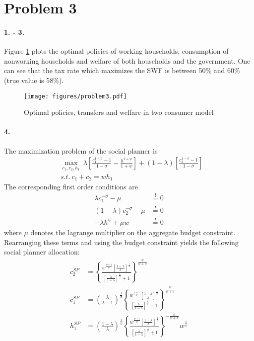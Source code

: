 \section*{Problem 3}

\paragraph{1. - 3.}
Figure \ref{fig:problem3} plots the optimal policies of working households, consumption of nonworking households and welfare of both households and the government. One can see that the tax rate which maximizes the SWF is between 50\% and 60\% (true value is 58\%).
\begin{figure}[h]
\texttt{[image: figures/problem3.pdf]}
\caption{Optimal policies, transfers and welfare in two consumer model}
\label{fig:problem3}
\end{figure}

\paragraph{4.}
The maximization problem of the social planner is
\begin{align*}
&\max_{c_1, c_2, h_1} ~ \lambda \left[\frac{c_1^{1 - \sigma} - 1}{1 - \sigma} - \frac{h^{1 + \psi}}{1 + \psi}\right] + \left(1 - \lambda\right) \left[ \frac{c_2^{1 - \sigma} - 1}{1 - \sigma}\right] \\
&s.t.~c_1 + c_2 = w h_1
\end{align*}
The corresponding first order conditions are
\begin{align*}
\lambda c_1^{- \sigma} - \mu &\overset{!}{=} 0 \\
\left(1 - \lambda \right) c_2^{- \sigma} - \mu &\overset{!}{=} 0 \\
- \lambda h^\psi + \mu w &\overset{!}{=} 0
\end{align*}
where $\mu $ denotes the lagrange multiplier on the aggregate budget constraint.
Rearranging these terms and using the budget constraint yields the following social planner allocation:
\begin{align*}
c_2^{SP} &= \left\{ \frac{ w^{ \frac{\psi + 1}{\psi} } \left[\frac{1 - \lambda}{\lambda}\right]^{ \frac{1}{\psi} } }{ \left[ \frac{\lambda}{1 - \lambda} \right]^{ \frac{1}{\sigma} } + 1 } \right\}^{\frac{\psi}{\psi + \sigma}} \\
c_1^{SP} &= \left(\frac{\lambda}{\lambda - 1}\right)^{ \frac{1}{\sigma} }
\left\{ \frac{ w^{ \frac{\psi + 1}{\psi} } \left[\frac{1 - \lambda}{\lambda}\right]^{ \frac{1}{\psi} } }{ \left[ \frac{\lambda}{1 - \lambda} \right]^{ \frac{1}{\sigma} } + 1 } \right\}^{\frac{\psi}{\psi + \sigma}} \\
h_1^{SP} &= \left( \frac{1 - \lambda}{\lambda} \right)^{ \frac{1}{\psi} }
\left\{ \frac{ w^{ \frac{\psi + 1}{\psi} } \left[\frac{1 - \lambda}{\lambda}\right]^{ \frac{1}{\psi} } }{ \left[ \frac{\lambda}{1 - \lambda} \right]^{ \frac{1}{\sigma} } + 1 } \right\}^{ - \frac{\sigma}{\psi + \sigma} } w^{ \frac{1}{\psi} }
\end{align*}

